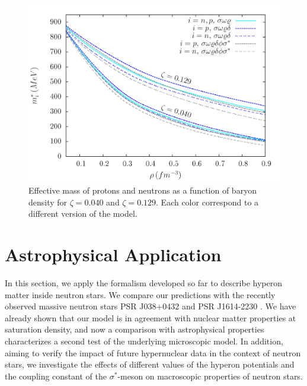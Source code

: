 \documentclass[twocolumn,showpacs,aps]{revtex4}
\begin{document}
 \begin{figure}
 \centering
 \vspace{1.0cm}
 \includegraphics[width=9.cm]{meff_rho_paper.png}
 \caption{\label{meff_rho} Effective mass of protons and neutrons as a function of baryon density for $\zeta=0.040$ and $\zeta=0.129$.
 Each color correspond to a different version of the model.}
 \end{figure}


\section{Astrophysical Application } \label{astro_application_section}

In this section, we apply the formalism developed so far to describe hyperon matter inside neutron stars.
We compare our predictions with the recently observed massive neutron stars PSR J038+0432 and PSR J1614-2230 \cite{Demorest2010,Antoniadis2013}.
We have already shown that our model is in agreement with nuclear matter properties at saturation density, 
and now a comparison with astrophysical properties characterizes a second test of the underlying microscopic model.
In addition, aiming to verify the impact of future hypernuclear data in the context of neutron stars,
we investigate the effects of different values of the hyperon potentials and the coupling constant of 
the $\sigma^*$-meson on macroscopic properties of neutron stars.
\end{document}
